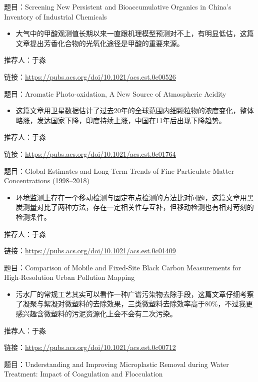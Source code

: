 \documentclass[
]{book}
\providecommand{\tightlist}{%
  \setlength{\itemsep}{0pt}\setlength{\parskip}{0pt}}
\begin{document}
题目：Screening New Persistent and Bioaccumulative Organics in China's Inventory of Industrial Chemicals

\begin{itemize}
\tightlist
\item
  大气中的甲酸观测值长期以来一直跟机理模型预测对不上，有明显低估，这篇文章提出芳香化合物的光氧化途径是甲酸的重要来源。
\end{itemize}

推荐人：于淼

链接：\url{https://pubs.acs.org/doi/10.1021/acs.est.0c00526}

题目：Aromatic Photo-oxidation, A New Source of Atmospheric Acidity

\begin{itemize}
\tightlist
\item
  这篇文章用卫星数据估计了过去20年的全球范围内细颗粒物的浓度变化，整体略涨，发达国家下降，印度持续上涨，中国在11年后出现下降趋势。
\end{itemize}

推荐人：于淼

链接：\url{https://pubs.acs.org/doi/10.1021/acs.est.0c01764}

题目：Global Estimates and Long-Term Trends of Fine Particulate Matter Concentrations (1998--2018)

\begin{itemize}
\tightlist
\item
  环境监测上存在一个移动检测与固定布点检测的方法比对问题，这篇文章用黑炭测量对比了两种方法，存在一定相关性与互补，但移动检测也有相对苛刻的检测条件。
\end{itemize}

推荐人：于淼

链接：\url{https://pubs.acs.org/doi/10.1021/acs.est.0c01409}

题目：Comparison of Mobile and Fixed-Site Black Carbon Measurements for High-Resolution Urban Pollution Mapping

\begin{itemize}
\tightlist
\item
  污水厂的常规工艺其实可以看作一种广谱污染物去除手段，这篇文章仔细考察了凝聚与絮凝对微塑料的去除效果，三类微塑料去除效率高于80\%，不过我更感兴趣含微塑料的污泥资源化上会不会有二次污染。
\end{itemize}

推荐人：于淼

链接：\url{https://pubs.acs.org/doi/10.1021/acs.est.0c00712}

题目：Understanding and Improving Microplastic Removal during Water Treatment: Impact of Coagulation and Flocculation
\end{document}
